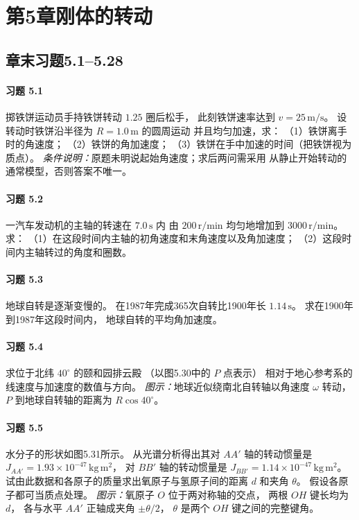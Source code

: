 \section*{第5章\quad 刚体的转动}
\subsection*{章末习题5.1--5.28}

\paragraph{习题 5.1}
掷铁饼运动员手持铁饼转动 \(1.25\) 圈后松手，
此刻铁饼速率达到 \(v=25\,\mathrm{m/s}\)。
设转动时铁饼沿半径为 \(R=1.0\,\mathrm m\) 的圆周运动
并且均匀加速，求：
（1）铁饼离手时的角速度；
（2）铁饼的角加速度；
（3）铁饼在手中加速的时间（把铁饼视为质点）。
\textit{条件说明：}原题未明说起始角速度；求后两问需采用
从静止开始转动的通常模型，否则答案不唯一。

\paragraph{习题 5.2}
一汽车发动机的主轴的转速在 \(7.0\,\mathrm s\) 内
由 \(200\,\mathrm{r/min}\) 均匀地增加到
\(3000\,\mathrm{r/min}\)。求：
（1）在这段时间内主轴的初角速度和末角速度以及角加速度；
（2）这段时间内主轴转过的角度和圈数。

\paragraph{习题 5.3}
地球自转是逐渐变慢的。
在1987年完成365次自转比1900年长 \(1.14\,\mathrm s\)。
求在1900年到1987年这段时间内，
地球自转的平均角加速度。

\paragraph{习题 5.4}
求位于北纬 \(40^\circ\) 的颐和园排云殿
（以图5.30中的 \(P\) 点表示）
相对于地心参考系的线速度与加速度的数值与方向。
\textit{图示：}地球近似绕南北自转轴以角速度 \(\omega\) 转动，
\(P\) 到地球自转轴的距离为 \(R\cos40^\circ\)。

\paragraph{习题 5.5}
水分子的形状如图5.31所示。
从光谱分析得出其对 \(AA'\) 轴的转动惯量是
\(J_{AA'}=1.93\times10^{-47}\,\mathrm{kg\,m^2}\)，
对 \(BB'\) 轴的转动惯量是
\(J_{BB'}=1.14\times10^{-47}\,\mathrm{kg\,m^2}\)。
试由此数据和各原子的质量求出氧原子与氢原子间的距离
\(d\) 和夹角 \(\theta\)。
假设各原子都可当质点处理。
\textit{图示：}氧原子 \(O\) 位于两对称轴的交点，
两根 \(OH\) 键长均为 \(d\)，
各与水平 \(AA'\) 正轴成夹角 \(\pm\theta/2\)，
\(\theta\) 是两个 \(OH\) 键之间的完整键角。

